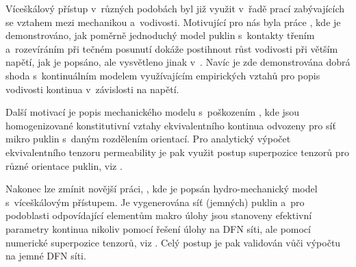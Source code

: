 \documentclass{article}
\begin{document}
Víceškálový přístup v~různých podobách byl již využit v~řadě prací zabývajících se vztahem mezi mechanikou a~vodivosti. 
Motivující pro nás byla práce \cite{Min2004a}, kde je demonstrováno, jak poměrně jednoduchý model puklin
s~kontakty třením a~rozevíráním při tečném posunutí
dokáže postihnout růst vodivosti při větším napětí, jak je popsáno, ale vysvětleno jinak v~\cite{Souley2001}.
Navíc je zde demonstrována dobrá shoda s~kontinuálním modelem využívajícím empirických vztahů pro popis vodivosti kontinua v~závislosti na napětí.

Další motivací je popis mechanického modelu s~poškozením \cite{Shao2005}, kde jsou homogenizované konstitutivní vztahy ekvivalentního kontinua
odvozeny pro síť mikro puklin s~daným rozdělením orientací. Pro analytický výpočet ekvivalentního tenzoru permeability je pak využit postup superpozice tenzorů 
pro různé orientace puklin, viz \cite{Oda1986a}.

Nakonec lze zmínit novější práci, \cite{Rutqvist2013}, kde je popsán hydro-mechanický model s~víceškálovým přístupem. Je vygenerována síť (jemných) 
puklin a~pro podoblasti odpovídající elementům makro úlohy jsou stanoveny efektivní parametry kontinua nikoliv pomocí řešení  úlohy na DFN síti, 
ale pomocí numerické superpozice tenzorů, viz \cite{Oda1986a}. Celý postup je pak validován vůči výpočtu na jemné DFN síti.



% 
% 
\end{document}
